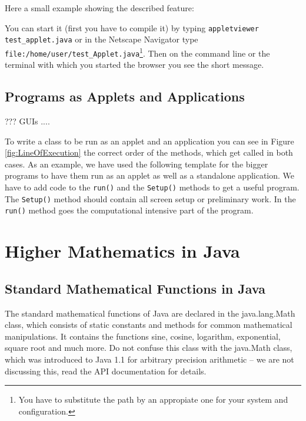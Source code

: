 Here a small example showing the described feature:

You can start it (first you have to compile it) 
by typing \verb|appletviewer test_applet.java| or 
in the Netscape Navigator type 
\verb|file:/home/user/test_Applet.java|\footnote{You have to substitute 
the path by an appropiate one for your system and configuration.}.
Then on the command line or the terminal with which you started the browser  
you see the short message.


\subsection{Programs as Applets and Applications}

??? GUIs ....

To write a class to be run as an applet and an application
you can see in Figure \ref{fig:LineOfExecution} the correct order
of the methods, which get called in both cases. As an example, 
we have used the following template for the 
bigger programs
to have them run as an applet as well as a standalone application.
We have to add code to the \verb|run()| and the \verb|Setup()| methods
to get a useful program. The  \verb|Setup()| method should contain all
screen setup or preliminary work. In the  \verb|run()| method goes
the computational intensive part of the program.



\section{Higher Mathematics in Java}

\subsection{Standard Mathematical Functions in Java}
\label{sec:Standard_Math}

The standard mathematical functions of Java are declared in the 
java.lang.Math class, which consists of static constants and methods
for common mathematical manipulations. 
It contains the functions sine, cosine, logarithm, exponential,
square root and much more. Do not confuse this class with the
java.Math class, which was introduced to Java 1.1 for arbitrary
precision arithmetic -- we are not discussing this, read the
API documentation for details.

